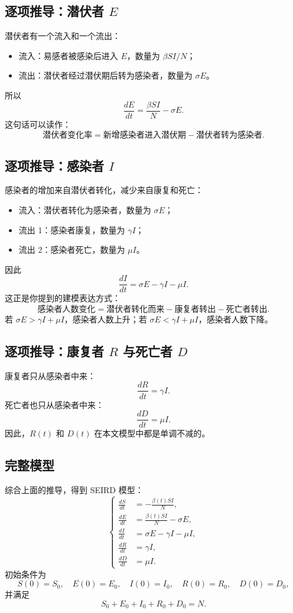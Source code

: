 \documentclass[UTF8,12pt,a4paper]{ctexart}
\begin{document}
\subsection{逐项推导：潜伏者 $E$}
潜伏者有一个流入和一个流出：
\begin{itemize}
\item 流入：易感者被感染后进入 $E$，数量为 $\beta SI/N$；
\item 流出：潜伏者经过潜伏期后转为感染者，数量为 $\sigma E$。
\end{itemize}
所以
\[
\frac{dE}{dt}=\frac{\beta S I}{N}-\sigma E.
\]
这句话可以读作：
\[
\text{潜伏者变化率}=\text{新增感染者进入潜伏期}-\text{潜伏者转为感染者}.
\]

\subsection{逐项推导：感染者 $I$}
感染者的增加来自潜伏者转化，减少来自康复和死亡：
\begin{itemize}
\item 流入：潜伏者转化为感染者，数量为 $\sigma E$；
\item 流出 1：感染者康复，数量为 $\gamma I$；
\item 流出 2：感染者死亡，数量为 $\mu I$。
\end{itemize}
因此
\[
\frac{dI}{dt}=\sigma E-\gamma I-\mu I.
\]
这正是你提到的建模表达方式：
\[
\boxed{\text{感染者人数变化}=\text{潜伏者转化而来}-\text{康复者转出}-\text{死亡者转出}.}
\]
若 $\sigma E>\gamma I+\mu I$，感染者人数上升；若 $\sigma E<\gamma I+\mu I$，感染者人数下降。

\subsection{逐项推导：康复者 $R$ 与死亡者 $D$}
康复者只从感染者中来：
\[
\frac{dR}{dt}=\gamma I.
\]
死亡者也只从感染者中来：
\[
\frac{dD}{dt}=\mu I.
\]
因此，$R(t)$ 和 $D(t)$ 在本文模型中都是单调不减的。

\subsection{完整模型}
综合上面的推导，得到 SEIRD 模型：
\begin{equation}
\left\{
\begin{aligned}
\frac{dS}{dt}&=-\frac{\beta(t)S I}{N},\\
\frac{dE}{dt}&=\frac{\beta(t)S I}{N}-\sigma E,\\
\frac{dI}{dt}&=\sigma E-\gamma I-\mu I,\\
\frac{dR}{dt}&=\gamma I,\\
\frac{dD}{dt}&=\mu I.
\end{aligned}
\right.
\label{eq:seird}
\end{equation}
初始条件为
\[
S(0)=S_0,\quad E(0)=E_0,\quad I(0)=I_0,\quad R(0)=R_0,\quad D(0)=D_0,
\]
并满足
\[
S_0+E_0+I_0+R_0+D_0=N.
\]
\end{document}
